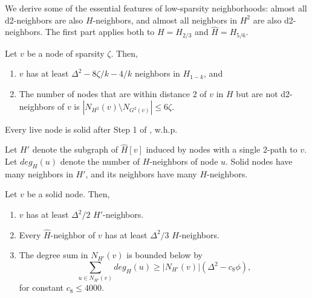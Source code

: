 We derive some of the essential features of low-sparsity neighborhoods: almost all d2-neighbors are also $H$-neighbors, and almost all neighbors in $H^2$ are also d2-neighbors.
The first part applies both to $H = H_{2/3}$ and $\hat{H} = H_{5/6}$. 

\begin{lemma}
Let $v$ be a node of sparsity $\zeta$.
Then,
\begin{enumerate}
    \item $v$ has at least $\Delta^2 - 8\zeta/k -4/k$ neighbors in $H_{1-k}$, and
    \item The number of nodes that are within distance 2 of $v$ in $H$ but are not d2-neighbors of $v$ is
$|N_{H^2}(v) \setminus N_{G^2(v)}| \le 6\zeta$.
\end{enumerate}
\label{L:h-degree}
\end{lemma}
 

\begin{observation}
Every live node is solid after Step 1 of , w.h.p.
\label{O:sparse}
\end{observation}


Let $H'$ denote the subgraph of $\hat{H}[v]$ induced by nodes with a single 2-path to $v$.
Let $deg_H(u)$ denote the number of $H$-neighbors of node $u$.
Solid nodes have many neighbors in $H'$, and its neighbors have many $H$-neighbors.
\begin{lemma}
Let $v$ be a solid node.
Then,
\begin{enumerate} 
  \item $v$ has at least $\Delta^2/2$ $H'$-neighbors.
  \item Every $\hat{H}$-neighbor of $v$ has at least $\Delta^2/3$ $H$-neighbors.
  \item The degree sum in $N_{H'}(v)$ is bounded below by
      \[ \sum_{u \in N_{H'}(v)} deg_H(u) \ge |N_{H'}(v)| (\Delta^2 - c_8\phi), \]
     for constant $c_8 \le 4000$.
\end{enumerate}
\label{L:H-neighbors}
\end{lemma}

